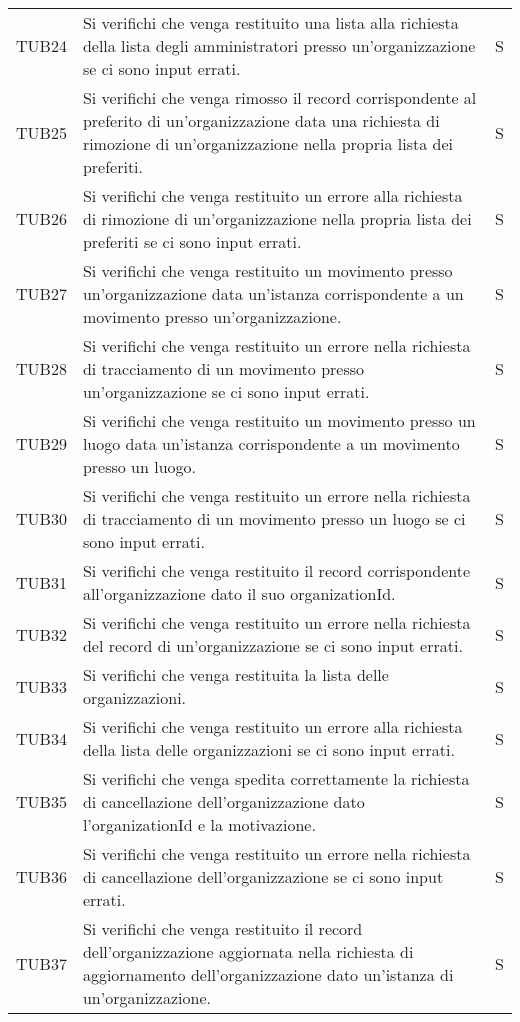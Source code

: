 {\begin{longtable}{ c C{13cm} C{1cm}}
TUB24 & Si verifichi che venga restituito una lista alla richiesta della lista degli amministratori presso un'organizzazione se ci sono input errati. & S \\
TUB25 & Si verifichi che venga rimosso il record corrispondente al preferito di un'organizzazione data una richiesta di rimozione di un'organizzazione nella propria lista dei preferiti. & S \\
TUB26 & Si verifichi che venga restituito un errore alla richiesta di rimozione di un'organizzazione nella propria lista dei preferiti se ci sono input errati. & S \\
TUB27 & Si verifichi che venga restituito un movimento presso un'organizzazione data un'istanza corrispondente a un movimento presso un'organizzazione. & S \\
TUB28 & Si verifichi che venga restituito un errore nella richiesta di tracciamento di un movimento presso un'organizzazione se ci sono input errati. & S \\
TUB29 & Si verifichi che venga restituito un movimento presso un luogo data un'istanza corrispondente a un movimento presso un luogo. & S \\
TUB30 & Si verifichi che venga restituito un errore nella richiesta di tracciamento di un movimento presso un luogo se ci sono input errati. & S \\
TUB31 & Si verifichi che venga restituito il record corrispondente all'organizzazione dato il suo organizationId. & S \\
TUB32 & Si verifichi che venga restituito un errore nella richiesta del record di un'organizzazione se ci sono input errati. & S \\
TUB33 & Si verifichi che venga restituita la lista delle organizzazioni. & S \\
TUB34 & Si verifichi che venga restituito un errore alla richiesta della lista delle organizzazioni se ci sono input errati. & S \\
TUB35 & Si verifichi che venga spedita correttamente la richiesta di cancellazione dell'organizzazione dato l'organizationId e la motivazione. & S \\
TUB36 & Si verifichi che venga restituito un errore nella richiesta di cancellazione dell'organizzazione se ci sono input errati. & S \\
TUB37 & Si verifichi che venga restituito il record dell'organizzazione aggiornata nella richiesta di aggiornamento dell'organizzazione dato un'istanza di un'organizzazione. & S \\

\end{longtable}}
